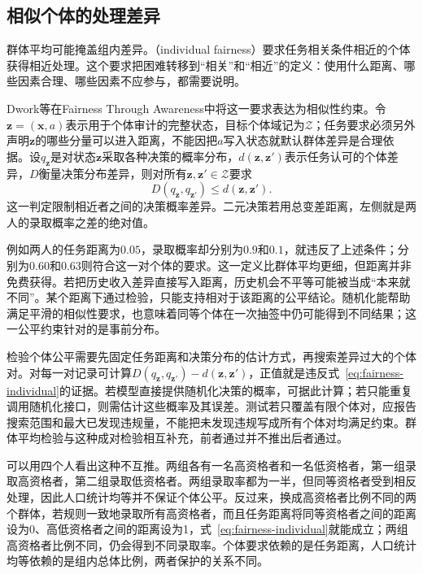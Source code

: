 \subsection{相似个体的处理差异}
\label{sec:fairness-individual-comparison}

群体平均可能掩盖组内差异。（individual fairness）要求任务相关条件相近的个体获得相近处理。这个要求把困难转移到“相关”和“相近”的定义：使用什么距离、哪些因素合理、哪些因素不应参与，都需要说明。

Dwork等在Fairness Through Awareness中将这一要求表达为相似性约束。令$\bm z=(\bm x,a)$表示用于个体审计的完整状态，目标个体域记为$\mathcal Z$；任务要求必须另外声明$\bm z$的哪些分量可以进入距离，不能因把$a$写入状态就默认群体差异是合理依据。设$q_{\bm z}$是对状态$\bm z$采取各种决策的概率分布，$d(\bm z,\bm z')$表示任务认可的个体差异，$D$衡量决策分布差异，则对所有$\bm z,\bm z'\in\mathcal Z$要求
\begin{equation}
 D(q_{\bm z},q_{\bm z'})\leq d(\bm z,\bm z').
 \label{eq:fairness-individual}
\end{equation}
这一判定限制相近者之间的决策概率差异。二元决策若用总变差距离，左侧就是两人的录取概率之差的绝对值。

例如两人的任务距离为$0.05$，录取概率却分别为$0.9$和$0.1$，就违反了上述条件；分别为$0.60$和$0.63$则符合这一对个体的要求。这一定义比群体平均更细，但距离并非免费获得。若把历史收入差异直接写入距离，历史机会不平等可能被当成“本来就不同”。某个距离下通过检验，只能支持相对于该距离的公平结论。随机化能帮助满足平滑的相似性要求，也意味着同等个体在一次抽签中仍可能得到不同结果；这一公平约束针对的是事前分布。

检验个体公平需要先固定任务距离和决策分布的估计方式，再搜索差异过大的个体对。对每一对记录可计算$D(q_{\bm z},q_{\bm z'})-d(\bm z,\bm z')$，正值就是违反式~\eqref{eq:fairness-individual}的证据。若模型直接提供随机化决策的概率，可据此计算；若只能重复调用随机化接口，则需估计这些概率及其误差。测试若只覆盖有限个体对，应报告搜索范围和最大已发现违规量，不能把未发现违规写成所有个体对均满足约束。群体平均检验与这种成对检验相互补充，前者通过并不推出后者通过。

可以用四个人看出这种不互推。两组各有一名高资格者和一名低资格者，第一组录取高资格者，第二组录取低资格者。两组录取率都为一半，但同等资格者受到相反处理，因此人口统计均等并不保证个体公平。反过来，换成高资格者比例不同的两个群体，若规则一致地录取所有高资格者，而且任务距离将同等资格者之间的距离设为0、高低资格者之间的距离设为1，式~\eqref{eq:fairness-individual}就能成立；两组高资格者比例不同，仍会得到不同录取率。个体要求依赖的是任务距离，人口统计均等依赖的是组内总体比例，两者保护的关系不同。

